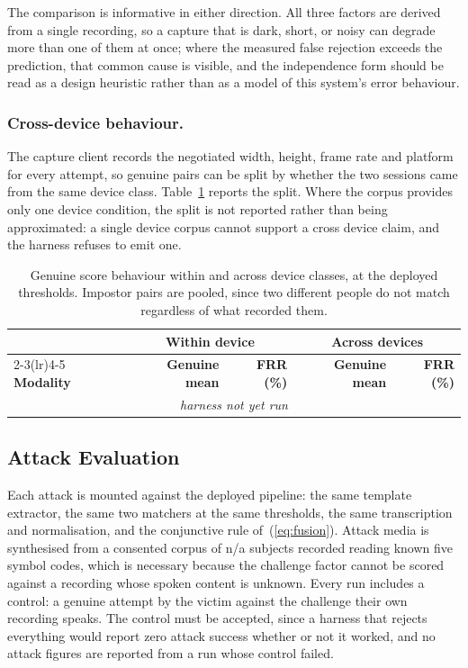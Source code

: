 \documentclass[runningheads]{llncs}
\providecommand{\EvalCrossDeviceRows}{\multicolumn{5}{c}{\textit{harness not yet run}}\\}
\providecommand{\AttackSubjects}{n/a}
\begin{document}
{The comparison is informative in either direction. All three factors are derived from a single recording, so a capture that is dark, short, or noisy can degrade more than one of them at once; where the measured false rejection exceeds the prediction, that common cause is visible, and the independence form should be read as a design heuristic rather than as a model of this system's error behaviour.

\subsubsection{Cross-device behaviour.}
The capture client records the negotiated width, height, frame rate and platform for every attempt, so genuine pairs can be split by whether the two sessions came from the same device class. Table~\ref{tab:crossdevice} reports the split. Where the corpus provides only one device condition, the split is not reported rather than being approximated: a single device corpus cannot support a cross device claim, and the harness refuses to emit one.

\begin{table}[!t]
\caption{Genuine score behaviour within and across device classes, at the deployed thresholds. Impostor pairs are pooled, since two different people do not match regardless of what recorded them.}
\label{tab:crossdevice}
\centering
\renewcommand{\arraystretch}{1.18}
\footnotesize
\begin{tabular}{lrrrr}
\toprule
& \multicolumn{2}{c}{\textbf{Within device}} & \multicolumn{2}{c}{\textbf{Across devices}} \\
\cmidrule(lr){2-3}\cmidrule(lr){4-5}
\textbf{Modality} & \textbf{Genuine mean} & \textbf{FRR (\%)} & \textbf{Genuine mean} & \textbf{FRR (\%)} \\
\midrule
\EvalCrossDeviceRows
\bottomrule
\end{tabular}
\end{table}

\subsection{Attack Evaluation}\label{sec:attacks}
Each attack is mounted against the deployed pipeline: the same template extractor, the same two matchers at the same thresholds, the same transcription and normalisation, and the conjunctive rule of~(\ref{eq:fusion}). Attack media is synthesised from a consented corpus of \AttackSubjects{} subjects recorded reading known five symbol codes, which is necessary because the challenge factor cannot be scored against a recording whose spoken content is unknown. Every run includes a control: a genuine attempt by the victim against the challenge their own recording speaks. The control must be accepted, since a harness that rejects everything would report zero attack success whether or not it worked, and no attack figures are reported from a run whose control failed.

}
\end{document}
